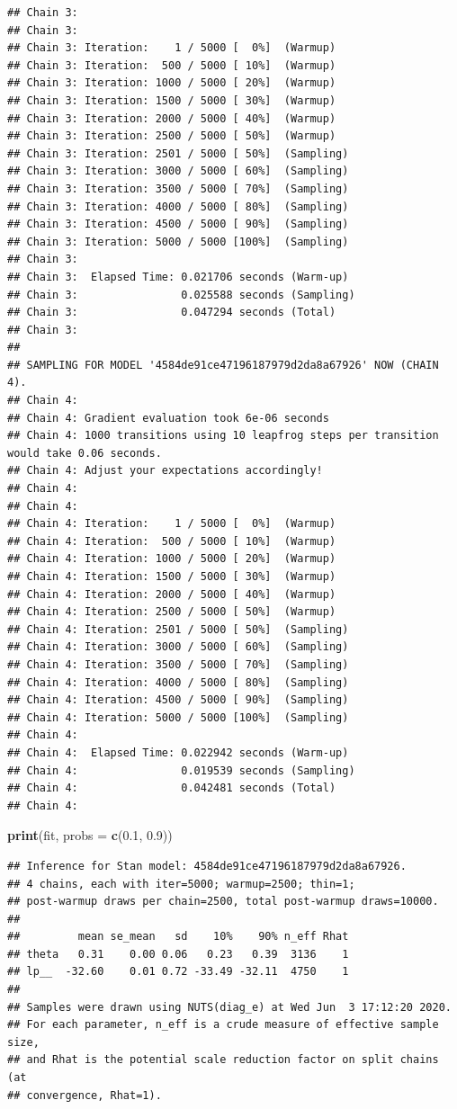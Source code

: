 \documentclass[
  12pt,
]{book}
\newenvironment{Shaded}{\begin{snugshade}}{\end{snugshade}}
\newcommand{\DataTypeTok}[1]{\textcolor[rgb]{0.13,0.29,0.53}{#1}}
\newcommand{\FloatTok}[1]{\textcolor[rgb]{0.00,0.00,0.81}{#1}}
\newcommand{\KeywordTok}[1]{\textcolor[rgb]{0.13,0.29,0.53}{\textbf{#1}}}
\newcommand{\NormalTok}[1]{#1}
\theoremstyle{definition}
\theoremstyle{definition}
\theoremstyle{definition}
\theoremstyle{remark}
\begin{document}
\begin{verbatim}
## Chain 3: 
## Chain 3: 
## Chain 3: Iteration:    1 / 5000 [  0%]  (Warmup)
## Chain 3: Iteration:  500 / 5000 [ 10%]  (Warmup)
## Chain 3: Iteration: 1000 / 5000 [ 20%]  (Warmup)
## Chain 3: Iteration: 1500 / 5000 [ 30%]  (Warmup)
## Chain 3: Iteration: 2000 / 5000 [ 40%]  (Warmup)
## Chain 3: Iteration: 2500 / 5000 [ 50%]  (Warmup)
## Chain 3: Iteration: 2501 / 5000 [ 50%]  (Sampling)
## Chain 3: Iteration: 3000 / 5000 [ 60%]  (Sampling)
## Chain 3: Iteration: 3500 / 5000 [ 70%]  (Sampling)
## Chain 3: Iteration: 4000 / 5000 [ 80%]  (Sampling)
## Chain 3: Iteration: 4500 / 5000 [ 90%]  (Sampling)
## Chain 3: Iteration: 5000 / 5000 [100%]  (Sampling)
## Chain 3: 
## Chain 3:  Elapsed Time: 0.021706 seconds (Warm-up)
## Chain 3:                0.025588 seconds (Sampling)
## Chain 3:                0.047294 seconds (Total)
## Chain 3: 
## 
## SAMPLING FOR MODEL '4584de91ce47196187979d2da8a67926' NOW (CHAIN 4).
## Chain 4: 
## Chain 4: Gradient evaluation took 6e-06 seconds
## Chain 4: 1000 transitions using 10 leapfrog steps per transition would take 0.06 seconds.
## Chain 4: Adjust your expectations accordingly!
## Chain 4: 
## Chain 4: 
## Chain 4: Iteration:    1 / 5000 [  0%]  (Warmup)
## Chain 4: Iteration:  500 / 5000 [ 10%]  (Warmup)
## Chain 4: Iteration: 1000 / 5000 [ 20%]  (Warmup)
## Chain 4: Iteration: 1500 / 5000 [ 30%]  (Warmup)
## Chain 4: Iteration: 2000 / 5000 [ 40%]  (Warmup)
## Chain 4: Iteration: 2500 / 5000 [ 50%]  (Warmup)
## Chain 4: Iteration: 2501 / 5000 [ 50%]  (Sampling)
## Chain 4: Iteration: 3000 / 5000 [ 60%]  (Sampling)
## Chain 4: Iteration: 3500 / 5000 [ 70%]  (Sampling)
## Chain 4: Iteration: 4000 / 5000 [ 80%]  (Sampling)
## Chain 4: Iteration: 4500 / 5000 [ 90%]  (Sampling)
## Chain 4: Iteration: 5000 / 5000 [100%]  (Sampling)
## Chain 4: 
## Chain 4:  Elapsed Time: 0.022942 seconds (Warm-up)
## Chain 4:                0.019539 seconds (Sampling)
## Chain 4:                0.042481 seconds (Total)
## Chain 4:
\end{verbatim}

\begin{Shaded}
\begin{Highlighting}[]
\KeywordTok{print}\NormalTok{(fit, }\DataTypeTok{probs =} \KeywordTok{c}\NormalTok{(}\FloatTok{0.1}\NormalTok{, }\FloatTok{0.9}\NormalTok{))}
\end{Highlighting}
\end{Shaded}

\begin{verbatim}
## Inference for Stan model: 4584de91ce47196187979d2da8a67926.
## 4 chains, each with iter=5000; warmup=2500; thin=1; 
## post-warmup draws per chain=2500, total post-warmup draws=10000.
## 
##         mean se_mean   sd    10%    90% n_eff Rhat
## theta   0.31    0.00 0.06   0.23   0.39  3136    1
## lp__  -32.60    0.01 0.72 -33.49 -32.11  4750    1
## 
## Samples were drawn using NUTS(diag_e) at Wed Jun  3 17:12:20 2020.
## For each parameter, n_eff is a crude measure of effective sample size,
## and Rhat is the potential scale reduction factor on split chains (at 
## convergence, Rhat=1).
\end{verbatim}
\end{document}
